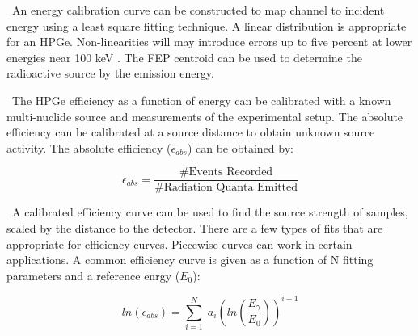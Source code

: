 \documentclass[journal]{IEEEtran}
\begin{document}
	\ An energy calibration curve can be constructed to map channel to incident energy using a least square fitting technique. A linear distribution is appropriate for an HPGe. Non-linearities will may introduce errors up to five percent at lower energies near 100 keV \cite{Knoll}. The FEP centroid can be
	used to determine the radioactive source by the emission energy.

	\ The HPGe efficiency as a function of energy can be calibrated with a known multi-nuclide source and measurements of the experimental setup. The absolute efficiency can be calibrated at a source distance to obtain unknown source activity\cite{Knoll}. The absolute efficiency ($\epsilon_{abs}$) can be obtained by:
	
	\begin{equation} \label{eq:effa}
	\epsilon_{abs} =\frac{\text{\# Events Recorded}}{\text{\# Radiation Quanta Emitted}}
	\end{equation}
	
	\ A calibrated efficiency curve can be used to find the source strength of samples, scaled by the distance to the detector. There are a few types of fits that are appropriate for efficiency curves. Piecewise curves can work in certain applications. A common efficiency curve is given as a function of N fitting parameters and a reference enrgy ($E_{0}$):
	
	\begin{equation} \label{eq:effa1}
    ln(\epsilon_{abs}) =   \sum_{i=1}^{N} \; a_{i} (ln(\dfrac{E_{\gamma}}{E_{0}}))^{i-1}
	\end{equation}
	
\end{document}

